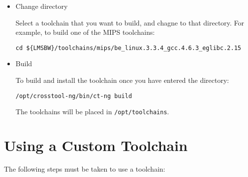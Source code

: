 \begin{itemize}
  \item Change directory

    Select a toolchain that you want to build, and chagne to that
    directory.  For example, to build one of the MIPS toolchains:

\begin{footnotesize}
\begin{verbatim}
cd ${LMSBW}/toolchains/mips/be_linux.3.3.4_gcc.4.6.3_eglibc.2.15
\end{verbatim}
\end{footnotesize}

  \item Build

    To build and install the toolchain once you have entered the
    directory:

    \texttt{/opt/crosstool-ng/bin/ct-ng build}

    The toolchains will be placed in \texttt{/opt/toolchains}.
\end{itemize}


\section{Using a Custom Toolchain}

The following steps must be taken to use a toolchain:

